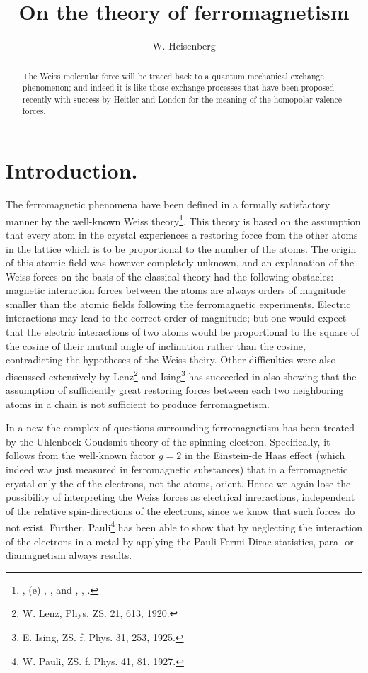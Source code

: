 \begin{paper}{1}
\begin{header}
\title{On the theory of ferromagnetism}
\author{W. Heisenberg}
\makeheader
\end{header}

\begin{abstract}
The Weiss molecular force will be traced back to a quantum mechanical exchange phenomenon; and indeed it is like those exchange processes that have been proposed recently with success by Heitler and London for the meaning of the homopolar valence forces.
\end{abstract}

\section*{Introduction.} The ferromagnetic phenomena have been defined in a formally satisfactory manner by the well-known Weiss theory\footnote{\citeauthor{P. Weiss},  (e) , , \citeyear{1907} and  , , \citeyear{1908}.}. This theory is based on the assumption that every atom in the crystal experiences a restoring force from the other atoms in the lattice which is to be proportional to the number of the  atoms. The origin of this atomic field was however completely unknown, and an explanation of the Weiss forces on the basis of the classical theory had the following obstacles: magnetic interaction forces between the atoms are always orders of magnitude smaller than the atomic fields following the ferromagnetic experiments. Electric interactions may lead to the correct order of magnitude; but one would expect that the electric interactions of two atoms would be proportional to the square of the cosine of their mutual angle of inclination rather than the cosine, contradicting the hypotheses of the Weiss theiry. Other difficulties were also discussed extensively by Lenz\footnote{W. Lenz, Phys. ZS. 21, 613, 1920.} and Ising\footnote{E. Ising, ZS. f. Phys. 31, 253, 1925.} has succeeded in also showing that the assumption of sufficiently great restoring forces between each two neighboring atoms in a chain is not sufficient to produce ferromagnetism.

In a new  the complex of questions surrounding ferromagnetism has been treated by the Uhlenbeck-Goudsmit theory of the spinning electron. Specifically, it follows from the well-known factor $g=2$ in the Einstein-de Haas effect (which indeed was just measured in ferromagnetic substances) that in a ferromagnetic crystal only the  of the electrons, not the atoms, orient. Hence we again lose the possibility of interpreting the Weiss forces as electrical inreractions, independent of the relative spin-directions of the electrons, since we know that such forces do not exist. Further, Pauli\footnote{W. Pauli, ZS. f. Phys. 41, 81, 1927.} has been able to show that by neglecting the interaction of the electrons in a metal by applying the Pauli-Fermi-Dirac statistics, para- or diamagnetism always results.


\end{paper}

